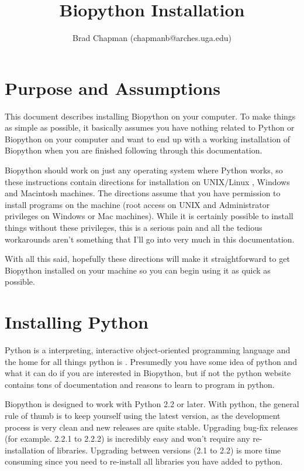 \documentclass{article}
\begin{document}
\title{Biopython Installation}
\author{Brad Chapman (chapmanb@arches.uga.edu)}

\maketitle
\tableofcontents

\section{Purpose and Assumptions}

This document describes installing Biopython on your computer. To make
things as simple as possible, it basically assumes you have nothing
related to Python or Biopython on your computer and want to end up with
a working installation of Biopython when you are finished following
through this documentation. 


Biopython should work on just any operating system where Python works,
so these instructions contain directions for installation on UNIX/Linux
, Windows and Macintosh machines. The directions assume 
that you have permission to install programs on the machine
(root access on UNIX and Administrator privileges on Windows or Mac
machines). While it is certainly possible to install things without
these privileges, this is a serious pain and all the tedious workarounds
aren't something that I'll go into very much in this documentation.

With all this said, hopefully these directions will make it
straightforward to get Biopython installed on your machine so you can
begin using it as quick as possible.

\section{Installing Python}

Python is a interpreting, interactive object-oriented programming
language and the home for all things python is
. Presumedly you have some idea of
python and what it can do if you are interested in Biopython, but if not
the python website contains tons of documentation and reasons to learn
to program in python.


Biopython is designed to work with Python 2.2 or later. With python, the
general rule of thumb is to keep yourself using the latest version, as
the development process is very clean and new releases are quite stable.
Upgrading bug-fix releases (for example. 2.2.1 to 2.2.2) 
is incredibly easy and won't require any re-installation of libraries.
Upgrading between versions (2.1 to 2.2) is more time consuming since you
need to re-install all libraries you have added to python.
\end{document}
